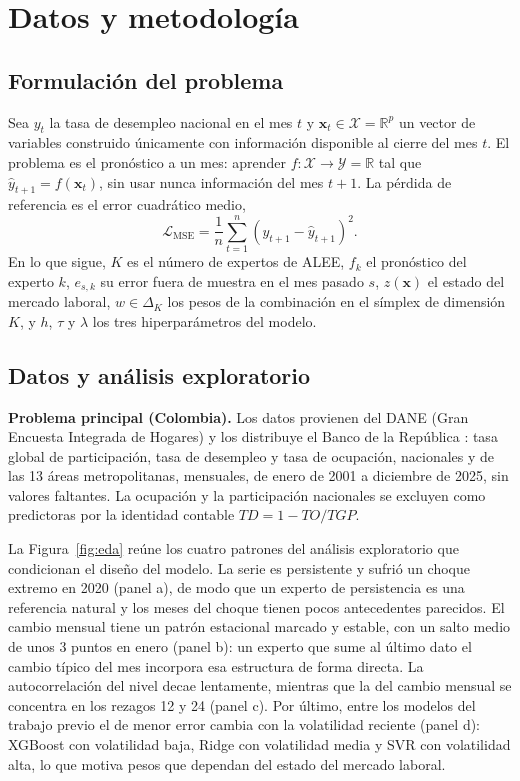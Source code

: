 \documentclass[11pt]{article}
\begin{document}
\newpage

\section{Datos y metodología}
\label{sec:metodos}

\subsection{Formulación del problema}

Sea $y_t$ la tasa de desempleo nacional en el mes $t$ y $\mathbf{x}_t\in\mathcal{X}=\mathbb{R}^p$ un vector de variables construido únicamente con información disponible al cierre del mes $t$. El problema es el pronóstico a un mes: aprender $f:\mathcal{X}\to\mathcal{Y}=\mathbb{R}$ tal que $\hat y_{t+1}=f(\mathbf{x}_t)$, sin usar nunca información del mes $t+1$. La pérdida de referencia es el error cuadrático medio,
\[
\mathcal{L}_{\mathrm{MSE}}=\frac{1}{n}\sum_{t=1}^{n}\left(y_{t+1}-\hat y_{t+1}\right)^2 .
\]
En lo que sigue, $K$ es el número de expertos de ALEE, $f_k$ el pronóstico del experto $k$, $e_{s,k}$ su error fuera de muestra en el mes pasado $s$, $z(\mathbf{x})$ el estado del mercado laboral, $w\in\Delta_K$ los pesos de la combinación en el símplex de dimensión $K$, y $h$, $\tau$ y $\lambda$ los tres hiperparámetros del modelo.

\subsection{Datos y análisis exploratorio}
\label{sec:datos}

\textbf{Problema principal (Colombia).} Los datos provienen del DANE (Gran Encuesta Integrada de Hogares) y los distribuye el Banco de la República \cite{dane_geih,banrep2025series}: tasa global de participación, tasa de desempleo y tasa de ocupación, nacionales y de las 13 áreas metropolitanas, mensuales, de enero de 2001 a diciembre de 2025, sin valores faltantes. La ocupación y la participación nacionales se excluyen como predictoras por la identidad contable $TD = 1 - TO/TGP$.

La Figura~\ref{fig:eda} reúne los cuatro patrones del análisis exploratorio que condicionan el diseño del modelo. La serie es persistente y sufrió un choque extremo en 2020 (panel a), de modo que un experto de persistencia es una referencia natural y los meses del choque tienen pocos antecedentes parecidos. El cambio mensual tiene un patrón estacional marcado y estable, con un salto medio de unos 3 puntos en enero (panel b): un experto que sume al último dato el cambio típico del mes incorpora esa estructura de forma directa. La autocorrelación del nivel decae lentamente, mientras que la del cambio mensual se concentra en los rezagos 12 y 24 (panel c). Por último, entre los modelos del trabajo previo el de menor error cambia con la volatilidad reciente (panel d): XGBoost con volatilidad baja, Ridge con volatilidad media y SVR con volatilidad alta, lo que motiva pesos que dependan del estado del mercado laboral.
\end{document}
